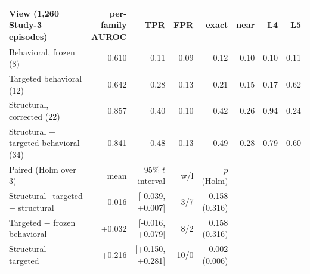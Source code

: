 \begin{tabular}{lrrrrrrr}\toprule
View (1,260 Study-3 episodes) & per-family AUROC & TPR & FPR & exact & near & L4 & L5\\\midrule
Behavioral, frozen (8) & 0.610 & 0.11 & 0.09 & 0.12 & 0.10 & 0.10 & 0.11\\
Targeted behavioral (12) & 0.642 & 0.28 & 0.13 & 0.21 & 0.15 & 0.17 & 0.62\\
Structural, corrected (22) & 0.857 & 0.40 & 0.10 & 0.42 & 0.26 & 0.94 & 0.24\\
Structural + targeted behavioral (34) & 0.841 & 0.48 & 0.13 & 0.49 & 0.28 & 0.79 & 0.60\\
\midrule Paired (Holm over 3) & mean & 95\% $t$ interval & w/l & $p$ (Holm) &&&\\
Structural+targeted $-$ structural & -0.016 & [-0.039, +0.007] & 3/7 & 0.158 (0.316) &&&\\
Targeted $-$ frozen behavioral & +0.032 & [-0.016, +0.079] & 8/2 & 0.158 (0.316) &&&\\
Structural $-$ targeted & +0.216 & [+0.150, +0.281] & 10/0 & 0.002 (0.006) &&&\\
\bottomrule\end{tabular}

